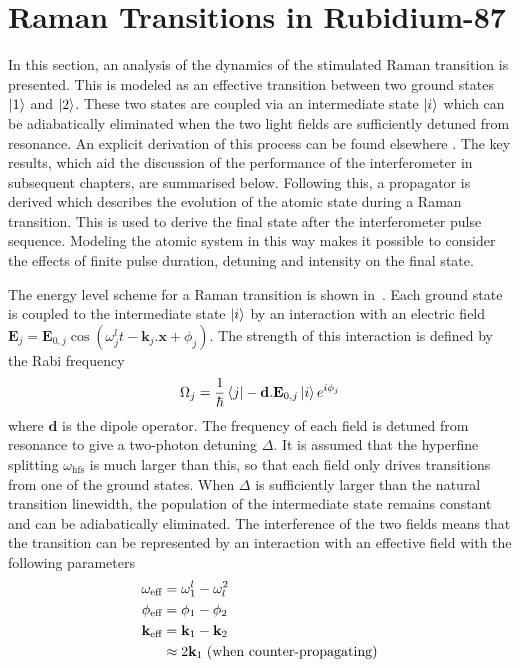 \section{Raman Transitions in Rubidium-87}\label{sec:theory_raman}
In this section, an analysis of the dynamics of the stimulated Raman transition is
presented. This is modeled as an effective transition between two
ground states $\ket{1}$ and $\ket{2}$. These two states are coupled
via an intermediate state $\ket{i}$ which can be adiabatically
eliminated when the two light fields are sufficiently detuned from
resonance. An explicit derivation of this process can be found
elsewhere
\cite{Weiss1994, Han2012}. The key results, which aid the discussion
of the performance of the interferometer in subsequent chapters, are
summarised below. Following this, a propagator is derived which
describes the evolution of the atomic state during a Raman transition.
This is used to derive the final state after the interferometer pulse
sequence. Modeling the atomic system in this way makes it possible to consider
the effects of finite pulse duration, detuning and intensity
on the final state. 
\par\noindent
The energy level scheme for a Raman transition is shown
in~. Each ground state is coupled to the
intermediate state $\ket{i}$ by an interaction with an electric field  
$ \textbf{E}_j=
\textbf{E}_{0,j} \cos(\omega_j^l t - \textbf{k}_j.\textbf{x}+
\phi_j)$. The strength of this interaction is defined by the Rabi
frequency\begin{equation}
  \label{eq:rabi_freq}
  \Omega_j = \frac{1}{\hbar}\bra{j} -\textbf{d}.\textbf{E}_{0,j}
  \ket{i} e^{i \phi_j}
\end{equation}
where $\textbf{d}$ is the dipole operator. The frequency of each field is detuned from resonance to
give a two-photon detuning $\Delta$. It is assumed that the
hyperfine splitting $\omega_\text{hfs}$ is much larger than this, so
that each field only drives transitions from one of the ground states. 
When $\Delta$ is sufficiently larger than the natural transition
linewidth, the population of the intermediate state remains constant
and can be adiabatically eliminated. The
interference of the two fields means that the transition can be
represented by an interaction with an effective field with the
following parameters
\begin{subequations}
  \begin{align}
    \omega_\textnormal{eff} &= \omega^l_1 - \omega^2_l \\
    \phi_\textnormal{eff} &= \phi_1 -\phi_2 \\
    {\textbf k_\textnormal{eff}} &= \textbf{k}_1 - \textbf{k}_2 \\
          &\approx 2\textbf{k}_1\;
    \text{(when counter-propagating)} \nonumber 
  \end{align}
\end{subequations}
